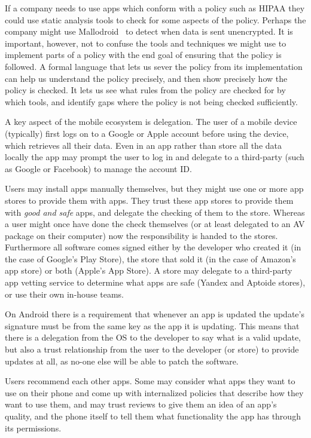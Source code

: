 \documentclass[thesis.tex]{subfiles}
\begin{document}
If a company needs to use apps which conform with a policy such as
\ac{HIPAA} they could use static analysis tools to check for some
aspects of the policy.  Perhaps the company might use
Mallodroid~\cite{fahl_why_2012} to detect when data is sent
unencrypted.  It is important, however, not to confuse the tools and
techniques we might use to implement parts of a policy with the end
goal of ensuring that the policy is followed.  A formal language that
lets us sever the policy from its implementation can help us
understand the policy precisely, and then show precisely how the
policy is checked.  It lets us see what rules from the policy are
checked for by which tools, and identify gaps where the policy is not
being checked sufficiently.

A key aspect of the mobile ecosystem is delegation.  The user of a
mobile device (typically) first logs on to a Google or Apple account
before using the device, which retrieves all their data.  Even in an
app rather than store all the data locally the app may prompt the user
to log in and delegate to a third-party (such as Google or Facebook)
to manage the account ID.

Users may install apps manually themselves, but they might use one or
more app stores to provide them with apps.  They trust these app
stores to provide them with \emph{good and safe} apps, and delegate
the checking of them to the store.  Whereas a user might once have
done the check themselves (or at least delegated to an \ac{AV} package
on their computer) now the responsibility is handed to the stores.
Furthermore all software comes signed either by the developer who
created it (in the case of Google's Play Store), the store that sold
it (in the case of Amazon's app store) or both (Apple's App Store).  A
store may delegate to a third-party app vetting service to determine
what apps are safe (Yandex and Aptoide stores), or use their own
in-house teams.

On Android there is a requirement that whenever
an app is updated the update's signature must be from the same key as
the app it is updating.  This means that there is a delegation from
the OS to the developer to say what is a valid update, but also a
trust relationship from the user to the developer (or store) to
provide updates at all, as no-one else will be able to patch the
software.

Users recommend each other apps.  Some may consider what apps they
want to use on their phone and come up with internalized policies that
describe how they want to use them, and may trust reviews to give them
an idea of an app's quality, and the phone itself to tell them what
functionality the app has through its permissions.
\end{document}
